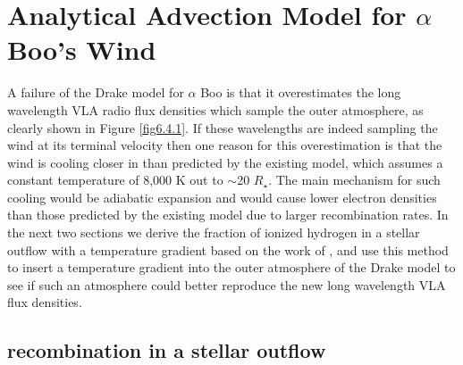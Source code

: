 \section{Analytical Advection Model for $\alpha$ Boo's Wind}
\label{sec:6.7}
A failure of the Drake model for $\alpha$ Boo is that it overestimates the long wavelength VLA radio flux densities which sample the outer atmosphere, as clearly shown in Figure \ref{fig6.4.1}. If these wavelengths are indeed sampling the wind at its terminal velocity then one reason for this overestimation is that the wind is cooling closer in than predicted by the existing model, which assumes a constant temperature of 8,000 K out to $\sim$20 $R_{\star}$. The main mechanism for such cooling would be adiabatic expansion \citep{ogorman_2011} and would cause lower electron densities than those predicted by the existing model due to larger recombination rates. In the next two sections we derive the fraction of ionized hydrogen in a stellar outflow with a temperature gradient based on the work of \cite{glassgold_1986}, and use this method to insert a temperature gradient into the outer atmosphere of the Drake model to see if such an atmosphere could better reproduce the new long wavelength VLA flux densities.

\subsection{ recombination in a stellar outflow}\label{sec:6.6.1}

